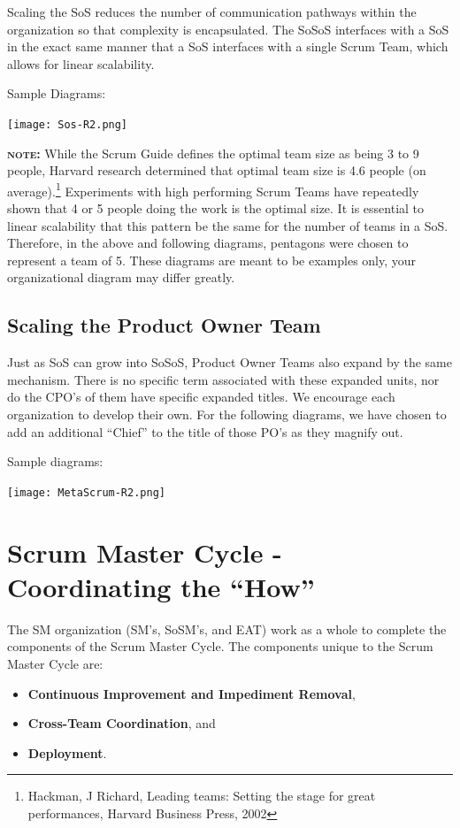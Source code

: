 \documentclass[12pt,a4paper,parskip=full]{scrartcl}
\begin{document}
Scaling the SoS reduces the number of communication pathways within the organization so that complexity is encapsulated. The SoSoS interfaces with a SoS in the exact same manner that a SoS interfaces with a single Scrum Team, which allows for linear scalability.

Sample Diagrams:

\texttt{[image: Sos-R2.png]}

\textbf{\textsc{note:}} While the Scrum Guide defines the optimal team size as being 3 to 9 people, Harvard research determined that optimal team size is 4.6 people (on average).\footnote{Hackman, J Richard, Leading teams: Setting the stage for great performances, Harvard Business Press, 2002} Experiments with high performing Scrum Teams have repeatedly shown that 4 or 5 people doing the work is the optimal size. It is essential to linear scalability that this pattern be the same for the number of teams in a SoS. Therefore, in the above and following diagrams, pentagons were chosen to represent a team of 5. These diagrams are meant to be examples only, your organizational diagram may differ greatly.

\subsection{Scaling the Product Owner Team}

Just as SoS can grow into SoSoS, Product Owner Teams also expand by the same mechanism. There is no specific term associated with these expanded units, nor do the CPO's of them have specific expanded titles. We encourage each organization to develop their own. For the following diagrams, we have chosen to add an additional ``Chief'' to the title of those PO's as they magnify out.

Sample diagrams:

\texttt{[image: MetaScrum-R2.png]}

\section{Scrum Master Cycle - Coordinating the ``How''}

The SM organization (SM's, SoSM's, and EAT) work as a whole to complete the components of the Scrum Master Cycle. The components unique to the Scrum Master Cycle are: 
\begin{itemize}
	\item \textbf{Continuous Improvement and Impediment Removal},
	\item \textbf{Cross-Team Coordination}, and
	\item \textbf{Deployment}.
\end{itemize}
\end{document}
